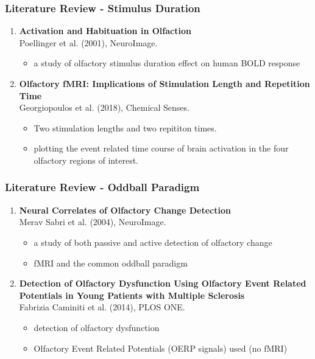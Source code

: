 \documentclass{beamer}
\newcounter{saveenumi}
\newcommand{\seti}{\setcounter{saveenumi}{\value{enumi}}}
\newcommand{\conti}{\setcounter{enumi}{\value{saveenumi}}}
\begin{document}
\begin{frame}
\frametitle{Literature Review - Stimulus Duration}

\begin{enumerate}
	\item \textrm{\textbf{Activation and Habituation in Olfaction}}
	\\
	Poellinger et al. (2001), NeuroImage.\\
	\begin{itemize}
		\item
		a study of olfactory stimulus duration effect on human BOLD response
	\end{itemize}

	\item  \textrm{\textbf{Olfactory fMRI: Implications of Stimulation Length and Repetition Time}}\\
	Georgiopoulos et al. (2018), Chemical Senses.\\
	
	\begin{itemize}
		\item
		Two stimulation lengths and two repititon times.
		\item
		plotting the event related time course of brain activation in the four olfactory regions of interest. 
	\end{itemize}
	\seti
\end{enumerate}
	

	


\end{frame}


\begin{frame}
\frametitle{Literature Review - Oddball Paradigm}
\begin{enumerate}
	\conti
	\item \textrm{\textbf{Neural Correlates of Olfactory Change Detection}}
	\\
	Merav Sabri et al. (2004), NeuroImage.
	\begin{itemize}
		\item
		a study of both passive and active detection of olfactory change
		\item
		fMRI and the common oddball paradigm
	\end{itemize}
	\item \textrm{\textbf{Detection of Olfactory Dysfunction Using Olfactory Event
			Related Potentials in Young Patients with Multiple
			Sclerosis}}
	\\
	Fabrizia Caminiti et al. (2014), PLOS ONE.
	\begin{itemize}
		\item
		detection of olfactory dysfunction 
		\item
		Olfactory Event Related Potentials (OERP signals) used (no fMRI)
	\end{itemize}
	\seti
\end{enumerate}
\end{frame}
\end{document}
